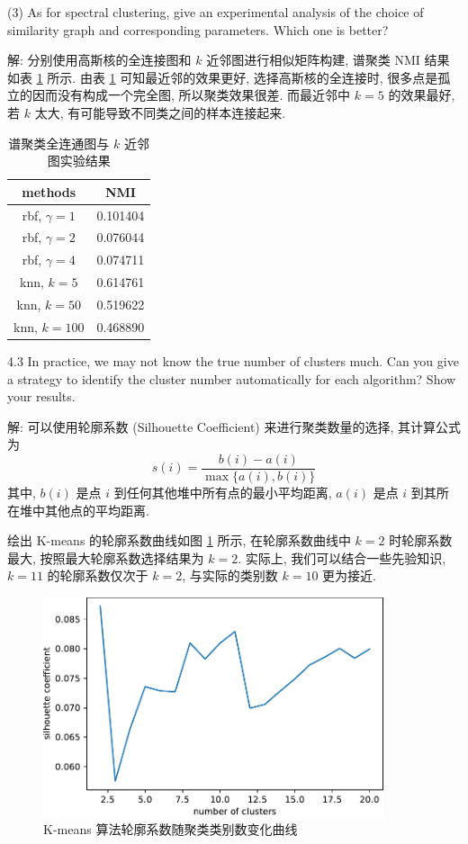\documentclass[openany]{ctexbook}
\theoremstyle{kaiti}
\theoremstyle{normal}
\begin{document}
(3) As for spectral clustering, give an experimental analysis of the choice of similarity graph and corresponding parameters. Which one is better?

解: 分别使用高斯核的全连接图和 $k$ 近邻图进行相似矩阵构建, 谱聚类 NMI 结果如表 \ref{tab:spectral_nmi} 所示. 由表 \ref{tab:spectral_nmi} 可知最近邻的效果更好, 选择高斯核的全连接时, 很多点是孤立的因而没有构成一个完全图, 所以聚类效果很差. 而最近邻中 $k=5$ 的效果最好, 若 $k$ 太大, 有可能导致不同类之间的样本连接起来.

\begin{table}[htbp]
  \centering
  \caption{谱聚类全连通图与 $k$ 近邻图实验结果}
  \label{tab:spectral_nmi}
  \begin{tabular}{cc}
    \toprule
    methods & NMI \\
    \midrule
    rbf, $\gamma=1$ &  0.101404 \\
    rbf, $\gamma=2$ &  0.076044 \\
    rbf, $\gamma=4$ &  0.074711 \\
    knn, $k=5$     &  0.614761 \\
    knn, $k=50$    &  0.519622 \\
    knn, $k=100$   &  0.468890 \\
    \bottomrule
  \end{tabular}
\end{table}

4.3 In practice, we may not know the true number of clusters much. Can you give a strategy to identify the cluster number automatically for each algorithm? Show your results.

解: 可以使用轮廓系数 (Silhouette Coefficient) \cite{silhouette} 来进行聚类数量的选择, 其计算公式为
\begin{equation}
  s(i)=\frac{b(i)-a(i)}{\max\{a(i),b(i)\}}
\end{equation}
其中, $b(i)$ 是点 $i$ 到任何其他堆中所有点的最小平均距离, $a(i)$ 是点 $i$ 到其所在堆中其他点的平均距离.

绘出 K-means 的轮廓系数曲线如图 \ref{fig:kmeans_silhouette} 所示, 在轮廓系数曲线中
$k=2$ 时轮廓系数最大, 按照最大轮廓系数选择结果为 $k=2$. 实际上, 我们可以结合一些先验知识, $k=11$ 的轮廓系数仅次于 $k=2$, 与实际的类别数 $k=10$ 更为接近.

\begin{figure}[htbp]
  \centering
  \includegraphics[width=10cm]{kmeans_silhouette.pdf}
  \caption{K-means 算法轮廓系数随聚类类别数变化曲线}
  \label{fig:kmeans_silhouette}
\end{figure}
\end{document}
